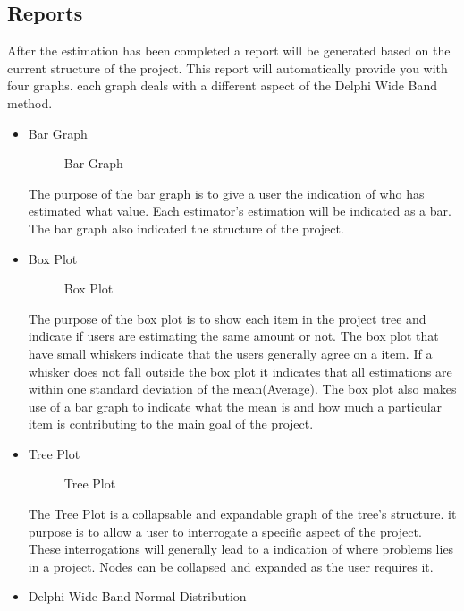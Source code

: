 \subsection{Reports}
After the estimation has been completed a report will be generated based on the current structure of the project. This report will automatically provide you with four graphs. each graph deals with a different aspect of the Delphi Wide Band method. 
\begin{itemize}
	\item{Bar Graph}
		\begin{figure}[H]
	    	\centering
	    	\caption{Bar Graph}
	    	\label{fig:Bar Graph}
   	\end{figure}
	The purpose of the bar graph is to give a user the indication of who has estimated what value. Each estimator's estimation will be indicated as a bar. The bar graph also indicated the structure of the project. 
	\item{Box Plot}
	\begin{figure}[H]
	    	\centering
	    	\caption{Box Plot}
	    	\label{fig:Box Plot}
   	\end{figure}
	The purpose of the box plot is to show each item in the project tree and indicate if users are estimating the same amount or not. The box plot that have small whiskers indicate that the users generally agree on a item. If a whisker does not fall outside the box plot it indicates that all estimations are within one standard deviation of the mean(Average). The box plot also makes use of a bar graph to indicate what the mean is and how much a particular item is contributing to the main goal of the project.
	\item{Tree Plot}
	\begin{figure}[H]
	    	\centering
	    	\caption{Tree Plot}
	    	\label{fig:Tree Plot}
   	\end{figure}
	The Tree Plot is a collapsable and expandable graph of the tree's structure. it purpose is to allow a user to interrogate a specific aspect of the project. These interrogations will generally lead to a indication of where problems lies in a project. Nodes can be collapsed and expanded as the user requires it. 
	\item{Delphi Wide Band Normal Distribution}
	\begin{figure}[H]
	    	\centering

\end{figure}
\end{itemize}
